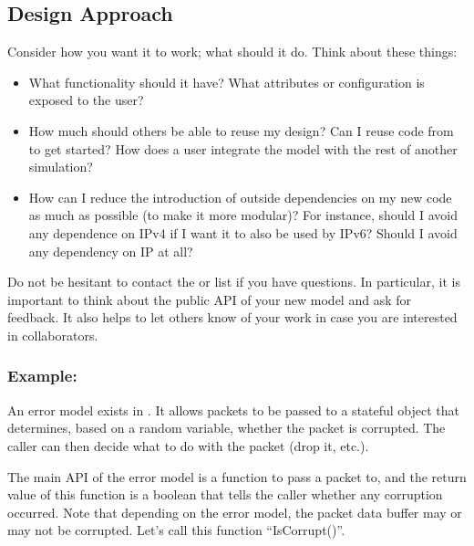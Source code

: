 \documentclass[letterpaper,10pt,english]{sphinxmanual}
\begin{document}
\subsection{Design Approach}
\label{\detokenize{new-models:design-approach}}
Consider how you want it to work; what should it do. Think about these things:
\begin{itemize}
\item {} 
  What functionality should it have?  What attributes or
configuration is exposed to the user?

\item {} 
  How much should others be able to reuse my design?  Can I
reuse code from  to get started?  How does a user integrate the model
with the rest of another simulation?

\item {} 
  How can I reduce the introduction of outside dependencies on
my new code as much as possible (to make it more modular)?  For instance,
should I avoid any dependence on IPv4 if I want it to also be used by IPv6?
Should I avoid any dependency on IP at all?

\end{itemize}

Do not be hesitant to contact the  or  list if you have
questions. In particular, it is important to think about the public API of your
new model and ask for feedback. It also helps to let others know of your work in
case you are interested in collaborators.


\subsubsection{Example: }
\label{\detokenize{new-models:example-errormodel}}
An error model exists in . It allows packets to be passed to a stateful
object that determines, based on a random variable, whether the packet is
corrupted.  The caller can then decide what to do with the packet (drop it,
etc.).

The main API of the error model is a function to pass a packet to, and the
return value of this function is a boolean that tells the caller whether any
corruption occurred.  Note that depending on the error model, the packet data
buffer may or may not be corrupted.  Let’s call this function “IsCorrupt()”.
\end{document}
